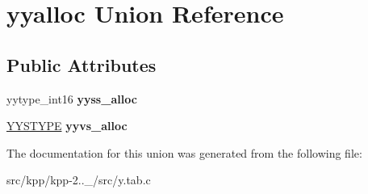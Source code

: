 \hypertarget{unionyyalloc}{}\section{yyalloc Union Reference}
\label{unionyyalloc}
\subsection*{Public Attributes}
\begin{DoxyCompactItemize}
\item 
\mbox{\label{unionyyalloc_a4800e0520a89a4789afa7b5d82197e65}} 
yytype\+\_\+int16 {\bfseries yyss\+\_\+alloc}
\item 
\mbox{\label{unionyyalloc_a9326f4fdc6f737a929444427836d8928}} 
\mbox{\hyperlink{unionYYSTYPE}{Y\+Y\+S\+T\+Y\+PE}} {\bfseries yyvs\+\_\+alloc}
\end{DoxyCompactItemize}


The documentation for this union was generated from the following file\+:\begin{DoxyCompactItemize}
\item 
src/kpp/kpp-\/2..\+\_/src/y.\+tab.\+c\end{DoxyCompactItemize}
